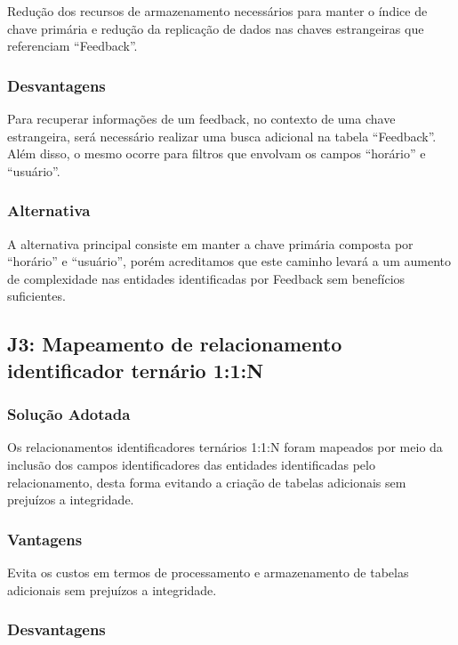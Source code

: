 Redução dos recursos de armazenamento necessários para manter o índice de chave
primária e redução da replicação de dados nas chaves estrangeiras que
referenciam ``Feedback''.

\subsubsection{Desvantagens}

Para recuperar informações de um feedback, no contexto de uma chave estrangeira,
será necessário realizar uma busca adicional na tabela ``Feedback''. Além disso,
o mesmo ocorre para filtros que envolvam os campos ``horário'' e ``usuário''.

\subsubsection{Alternativa}

A alternativa principal consiste em manter a chave primária composta por
``horário'' e ``usuário'', porém acreditamos que este caminho levará a um
aumento de complexidade nas entidades identificadas por Feedback sem benefícios
suficientes.

\subsection{\textbf{J3:} Mapeamento de relacionamento identificador ternário 1:1:N}

\subsubsection{Solução Adotada}

Os relacionamentos identificadores ternários 1:1:N foram mapeados por meio da
inclusão dos campos identificadores das entidades identificadas pelo
relacionamento, desta forma evitando a criação de tabelas adicionais sem
prejuízos a integridade.

\subsubsection{Vantagens}

Evita os custos em termos de processamento e armazenamento de tabelas
adicionais sem prejuízos a integridade.

\subsubsection{Desvantagens}

